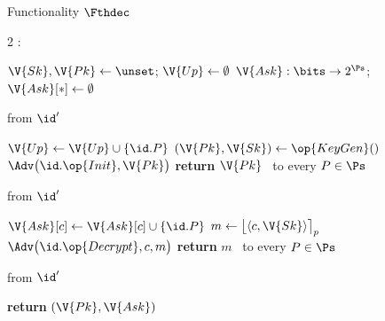 \begin{interface}[nofloat]{Functionality $\Fthdec$ \\
}

{\scriptsize
\setlength{\columnsep}{1.4em}
\begin{multicols}{2}
:
\begin{algorithmic}[1]
\setcounter{contline}{0}\algcont
\State $\V{Sk}, \V{Pk} \gets \unset$; \quad $\V{Up} \gets \emptyset$
\State $\V{Ask} : \bits \to 2^{\Ps}$; \quad $\V{Ask}[*] \gets \emptyset$
\algsave
\end{algorithmic}
\vspace{1.4ex}

 \quad from $\id'$
\begin{algorithmic}[1]
\algcont
{} \label{ln:thdeconce}
\State $\V{Up} \gets \V{Up} \cup \{\id.P\}$
 \label{ln:thdecall}
\State $(\V{Pk}, \V{Sk}) \gets \op{KeyGen}()$
\State $\Adv\bigl(\id.\op{Init}, \V{Pk}\bigr)$ \label{ln:thdecpk}
\State \textbf{return} $\V{Pk}$ \ to every $P \in \Ps$
\algsave
\end{algorithmic}
\vspace{1.4ex}

\columnbreak

 \quad from $\id'$
\begin{algorithmic}[1]
\algcont
{} \label{ln:thdecwf}
\State $\V{Ask}[c] \gets \V{Ask}[c] \cup \{\id.P\}$
 \label{ln:thdecunan}
\State $m \gets \bigl\lfloor \langle c, \V{Sk} \rangle \bigr\rceil_{p}$ \label{ln:thdecround}
\State $\Adv\bigl(\id.\op{Decrypt}, c, m\bigr)$ \label{ln:thdecadv}
\State \textbf{return} $m$ \ to every $P \in \Ps$
\algsave
\end{algorithmic}
\vspace{1.4ex}

 \quad from $\id'$
\begin{algorithmic}[1]
\algcont
\State \textbf{return} $(\V{Pk}, \V{Ask})$ \label{ln:thdecleak}
\algsave
\end{algorithmic}
\end{multicols}}
\end{interface}
